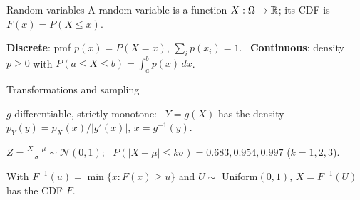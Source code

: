 \documentclass[aspectratio=1610,11pt]{beamer}
\begin{document}

\begin{frame}{Random variables}
    \small
    A random variable is a function $X: \Omega \to \mathbb{R}$; its CDF is $F(x) = P(X \leq x)$.
    \begin{definition}
        \small \textbf{Discrete}: pmf $p(x) = P(X = x)$, $\sum_ip(x_i) = 1$. \ \textbf{Continuous}: density $p \geq 0$ with $P(a \leq X \leq b) = \int_a^bp(x)\,dx$.
    \end{definition}
\end{frame}

\begin{frame}{Transformations and sampling}
    \begin{proposition}
        \small $g$ differentiable, strictly monotone: \ $Y = g(X)$ has the density $p_Y(y) = p_X(x)/|g'(x)|$, $x = g^{-1}(y)$.
    \end{proposition}
    \small $Z = \frac{X - \mu}{\sigma} \sim \mathcal{N}(0, 1)$; \ $P(|X - \mu| \leq k\sigma) = 0.683, 0.954, 0.997$ ($k = 1, 2, 3$).
    \begin{theorem}
        \small With $F^{-1}(u) = \min\{x : F(x) \geq u\}$ and $U \sim$ Uniform$(0, 1)$, $X = F^{-1}(U)$ has the CDF $F$.
    \end{theorem}
    \centering{}
\end{frame}
\end{document}

